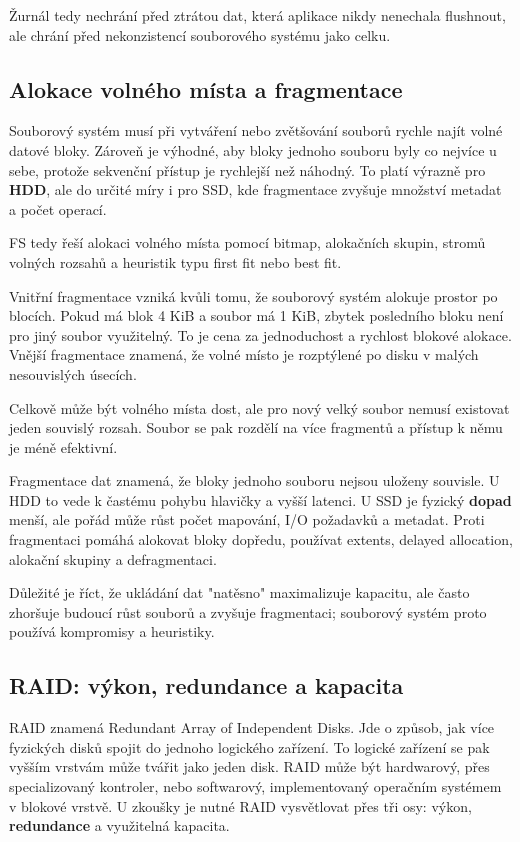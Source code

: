 Žurnál tedy nechrání před ztrátou dat, která aplikace nikdy nenechala flushnout, ale chrání před nekonzistencí souborového systému jako celku.

\subsection*{Alokace volného místa a fragmentace}

Souborový systém musí při vytváření nebo zvětšování souborů rychle najít volné datové bloky. Zároveň je výhodné, aby bloky jednoho souboru byly co nejvíce u sebe, protože sekvenční přístup je rychlejší než náhodný. To platí výrazně pro \textbf{HDD}, ale do určité míry i pro SSD, kde fragmentace zvyšuje množství metadat a počet operací.

FS tedy řeší alokaci volného místa pomocí bitmap, alokačních skupin, stromů volných rozsahů a heuristik typu first fit nebo best fit.

Vnitřní fragmentace vzniká kvůli tomu, že souborový systém alokuje prostor po blocích. Pokud má blok 4 KiB a soubor má 1 KiB, zbytek posledního bloku není pro jiný soubor využitelný. To je cena za jednoduchost a rychlost blokové alokace. Vnější fragmentace znamená, že volné místo je rozptýlené po disku v malých nesouvislých úsecích.

Celkově může být volného místa dost, ale pro nový velký soubor nemusí existovat jeden souvislý rozsah. Soubor se pak rozdělí na více fragmentů a přístup k němu je méně efektivní.

Fragmentace dat znamená, že bloky jednoho souboru nejsou uloženy souvisle. U HDD to vede k častému pohybu hlavičky a vyšší latenci. U SSD je fyzický \textbf{dopad} menší, ale pořád může růst počet mapování, I/O požadavků a metadat. Proti fragmentaci pomáhá alokovat bloky dopředu, používat extents, delayed allocation, alokační skupiny a defragmentaci.

Důležité je říct, že ukládání dat "natěsno" maximalizuje kapacitu, ale často zhoršuje budoucí růst souborů a zvyšuje fragmentaci; souborový systém proto používá kompromisy a heuristiky.

\subsection*{RAID: výkon, redundance a kapacita}

RAID znamená Redundant Array of Independent Disks. Jde o způsob, jak více fyzických disků spojit do jednoho logického zařízení. To logické zařízení se pak vyšším vrstvám může tvářit jako jeden disk. RAID může být hardwarový, přes specializovaný kontroler, nebo softwarový, implementovaný operačním systémem v blokové vrstvě. U zkoušky je nutné RAID vysvětlovat přes tři osy: výkon, \textbf{redundance} a využitelná kapacita.

